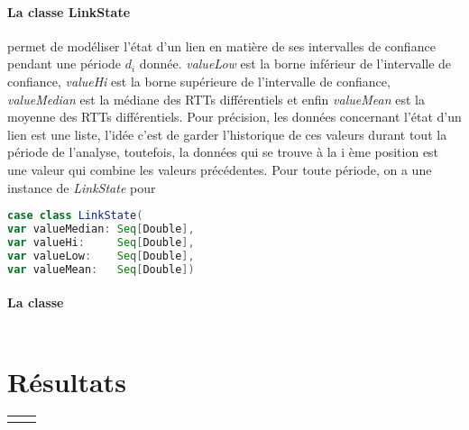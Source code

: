 \paragraph{La classe LinkState } permet de modéliser l'état d'un lien en matière de ses intervalles de confiance pendant une période $d_i$ donnée. \textit{valueLow} est la borne inférieur de l'intervalle de confiance, \textit{valueHi} est la borne supérieure de l'intervalle de confiance, \textit{valueMedian} est la médiane des RTTs différentiels et enfin \textit{valueMean} est la moyenne des RTTs différentiels. Pour précision, les données concernant l'état d'un lien est une liste, l'idée c'est de garder l'historique de ces valeurs durant tout la période de l'analyse, toutefois, la données qui se trouve à la i ème position est une valeur qui combine les valeurs précédentes.  Pour toute période, on a une instance de \textit{LinkState} pour 
\begin{lstlisting}[language=scala]
case class LinkState(
var valueMedian: Seq[Double],
var valueHi:     Seq[Double],
var valueLow:    Seq[Double],
var valueMean:   Seq[Double])
\end{lstlisting}
\paragraph{La classe } 
\begin{lstlisting}[language=scala]

\end{lstlisting}


\section{Résultats}

\begin{table}
	\begin{tabular}{cc}
& \\
	\end{tabular}
\end{table}